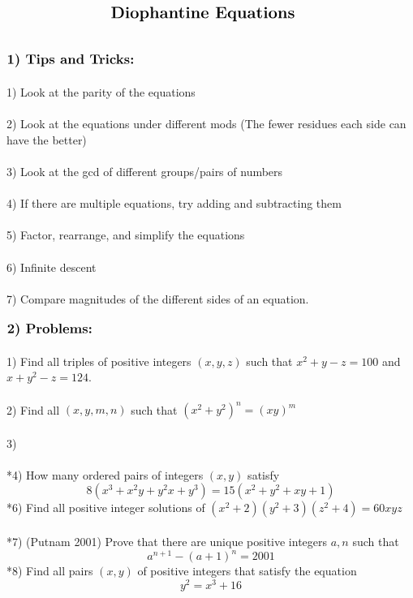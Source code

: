 \documentclass{article}
\begin{document}
$\centerline{\Large \textbf{Diophantine Equations}}$
\\
\\
\\
$\large \textbf{1) Tips and Tricks:}$  \\
\\
1) Look at the parity of the equations
\\
\\
2) Look at the equations under different mods (The fewer residues each side can have the better)
\\
\\
3) Look at the gcd of different groups/pairs of numbers
\\
\\
4) If there are multiple equations, try adding and subtracting them
\\
\\
5) Factor, rearrange, and simplify the equations
\\
\\
6) Infinite descent
\\
\\
7) Compare magnitudes of the different sides of an equation.
\\
\\
$\large \textbf{2) Problems:}$  \\
\\
1) Find all triples of positive integers $(x,y,z)$ such that $x^2+y-z=100$ and $x+y^2-z=124$.
\\
\\
2) Find all $(x,y,m,n)$ such that $(x^2+y^2)^n=(xy)^m$
\\
\\
3)
\\
\\
*4) How many ordered pairs of integers $(x,y)$ satisfy
\begin{equation*}
8(x^3+x^2y+y^2x+y^3)=15(x^2+y^2+xy+1)
\end{equation*}
*6) Find all positive integer solutions of $(x^2+2)(y^2+3)(z^2+4)=60xyz$
\\
\\
*7) (Putnam 2001) Prove that there are unique positive integers $a,n$ such that
\begin{equation*}
a^{n+1}-(a+1)^n=2001
\end{equation*}
*8) Find all pairs $(x,y)$ of positive integers that satisfy the equation
\begin{equation*}
y^2=x^3+16
\end{equation*}
\end{document}
